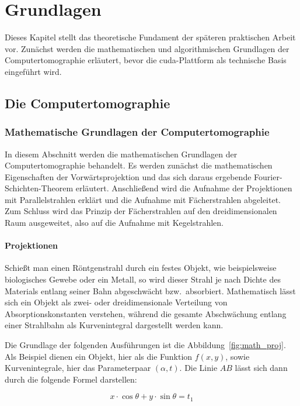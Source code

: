 \chapter{Grundlagen}\label{chap:grundlagen}

Dieses Kapitel stellt das theoretische Fundament der späteren praktischen Arbeit vor. Zunächst werden die
mathematischen und algorithmischen Grundlagen der Computertomographie erläutert, bevor die \gls{cuda}-Plattform als
technische Basis eingeführt wird.

\section{Die Computertomographie}

\subsection{Mathematische Grundlagen der Computertomographie}

In diesem Abschnitt werden die mathematischen Grundlagen der Computertomographie behandelt. Es werden zunächst die
mathematischen Eigenschaften der Vorwärtsprojektion und das sich daraus ergebende Fourier-Schichten-Theorem erläutert.
Anschließend wird die Aufnahme der Projektionen mit Parallelstrahlen erklärt und die Aufnahme mit Fächerstrahlen
abgeleitet. Zum Schluss wird das Prinzip der Fächerstrahlen auf den dreidimensionalen Raum ausgeweitet, also auf die
Aufnahme mit Kegelstrahlen.

\subsubsection{Projektionen}

Schießt man einen Röntgenstrahl durch ein festes Objekt, wie beispielsweise biologisches Gewebe oder ein Metall, so wird
dieser Strahl je nach Dichte des Materials entlang seiner Bahn abgeschwächt bzw.\ absorbiert. Mathematisch lässt sich
ein Objekt als zwei- oder dreidimensionale Verteilung von Absorptionskonstanten verstehen, während die gesamte
Abschwächung entlang einer Strahlbahn als Kurvenintegral dargestellt werden kann.

Die Grundlage der folgenden Ausführungen ist die Abbildung~\ref{fig:math_proj}. Als Beispiel dienen ein Objekt, hier als
die Funktion $f(x, y)$, sowie Kurvenintegrale, hier das Parameterpaar $(\alpha, t)$. Die Linie $AB$ lässt sich dann
durch die folgende Formel darstellen:

\begin{equation*}
    x \cdot \cos \theta + y \cdot \sin \theta  = t_1
\end{equation*}

